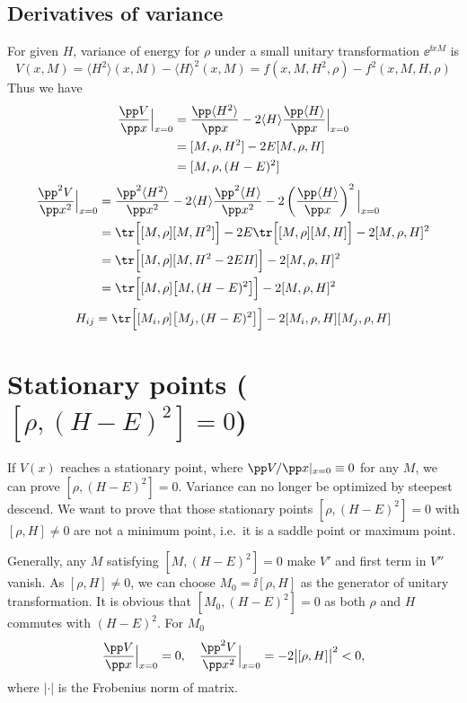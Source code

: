\documentclass[10pt]{article}
\begin{document}
\subsection{Derivatives of variance}
For given $H$, variance of energy for $\rho$ under a small unitary transformation $\ee^{\ii xM}$ is 
\begin{equation}
V(x, M)=\langle H^2\rangle(x, M)-\langle H\rangle^2(x, M)=f(x, M, H^2, \rho)-f^2(x, M, H, \rho)
\end{equation}
Thus we have
\begin{align}
\frac{\pp V}{\pp x}\Big|_{x=0}&=\frac{\pp \langle H^2\rangle}{\pp x}-2\langle H\rangle\frac{\pp \langle H\rangle}{\pp x}\Big|_{x=0}\\
&=[M, \rho, H^2]-2E[M, \rho, H]\\
&= [M, \rho, (H-E)^2]
\end{align}
\begin{align}
\frac{\pp^2 V}{\pp x^2}\Big|_{x=0}&=\frac{\pp^2 \langle H^2\rangle}{\pp x^2}-2\langle H\rangle\frac{\pp^2 \langle H\rangle}{\pp x^2}-2\left(\frac{\pp \langle H\rangle}{\pp x}\right)^2\Big|_{x=0}\\
&=\tr \Big[[M,\rho][M, H^2]\Big]-2E\tr \Big[[M,\rho][M, H]\Big]-2[M, \rho, H]^2\\
&=\tr \Big[[M,\rho][M, H^2-2EH]\Big]-2[M, \rho, H]^2\\
&=\tr \Big[[M,\rho]\big[M, (H-E)^2\big]\Big]-2[M, \rho, H]^2
\end{align}
\begin{equation}
	H_{ij}=\tr \Big[[M_i,\rho]\big[M_j, (H-E)^2\big]\Big]-2[M_i, \rho, H][M_j, \rho, H]
\end{equation}
\section{Stationary points (\texorpdfstring{$[\rho, (H-E)^2]=0$}{[rho, (H-E)**2]=0})}
If $V(x)$ reaches a stationary point, where $\pp V/\pp x|_{x=0}\equiv 0$ for any $M$, we can prove $[\rho, (H-E)^2]=0$. Variance can no longer be optimized by steepest descend. We want to prove that those stationary points $[\rho, (H-E)^2]=0$ with $[\rho, H]\neq 0$ are not a minimum point, i.e.\ it is a saddle point or maximum point. 

Generally, any $M$ satisfying $[M, (H-E)^2]=0$ make $V'$ and first term in $V''$ vanish. As $[\rho, H]\neq 0$, we can choose $M_0=\ii[\rho, H]$ as the generator of unitary transformation. It is obvious that $[M_0, (H-E)^2]=0$ as both $\rho$ and $H$ commutes with $(H-E)^2$. For $M_0$
\begin{equation}
\frac{\pp V}{\pp x}\Big|_{x=0}=0,\quad \frac{\pp^2 V}{\pp x^2}\Big|_{x=0}=-2\big|[\rho, H]\big|^2<0,
\end{equation}
where $|\cdot|$ is the Frobenius norm of matrix. 
\end{document}
